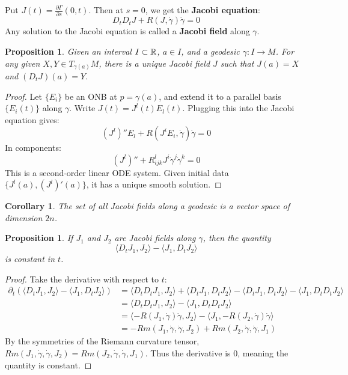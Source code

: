 \documentclass[11pt, a4paper]{article}
\theoremstyle{plain}
\newtheorem{proposition}[theorem]{Proposition}
\newtheorem{corollary}[theorem]{Corollary}
\theoremstyle{definition}
\theoremstyle{remark}
\begin{document}
{Put $J(t) = \frac{\partial \Gamma}{\partial s}(0,t)$. Then at $s=0$, we get the \textbf{Jacobi equation}:
\[ D_t D_t J + R(J, \dot{\gamma})\dot{\gamma} = 0 \]
Any solution to the Jacobi equation is called a \textbf{Jacobi field} along $\gamma$.

\begin{proposition}
Given an interval $I \subset \mathbb{R}$, $a \in I$, and a geodesic $\gamma: I \to M$. For any given $X, Y \in T_{\gamma(a)}M$, there is a unique Jacobi field $J$ such that $J(a) = X$ and $(D_t J)(a) = Y$.
\end{proposition}
\begin{proof}
Let $\{E_i\}$ be an ONB at $p = \gamma(a)$, and extend it to a parallel basis $\{E_i(t)\}$ along $\gamma$.
Write $J(t) = J^l(t) E_l(t)$. Plugging this into the Jacobi equation gives:
\[ (J^l)'' E_l + R(J^i E_i, \dot{\gamma})\dot{\gamma} = 0 \]
In components:
\[ (J^l)'' + R_{ijk}^l J^i \dot{\gamma}^j \dot{\gamma}^k = 0 \]
This is a second-order linear ODE system. Given initial data $\{J^l(a), (J^l)'(a)\}$, it has a unique smooth solution.
\end{proof}

\begin{corollary}
The set of all Jacobi fields along a geodesic is a vector space of dimension $2n$.
\end{corollary}

\begin{proposition}
If $J_1$ and $J_2$ are Jacobi fields along $\gamma$, then the quantity
\[ \langle D_t J_1, J_2 \rangle - \langle J_1, D_t J_2 \rangle \]
is constant in $t$.
\end{proposition}
\begin{proof}
Take the derivative with respect to $t$:
\begin{align*}
    \partial_t (\langle D_t J_1, J_2 \rangle - \langle J_1, D_t J_2 \rangle) &= \langle D_t D_t J_1, J_2 \rangle + \langle D_t J_1, D_t J_2 \rangle - \langle D_t J_1, D_t J_2 \rangle - \langle J_1, D_t D_t J_2 \rangle \\
    &= \langle D_t D_t J_1, J_2 \rangle - \langle J_1, D_t D_t J_2 \rangle \\
    &= \langle -R(J_1, \dot{\gamma})\dot{\gamma}, J_2 \rangle - \langle J_1, -R(J_2, \dot{\gamma})\dot{\gamma} \rangle \\
    &= -Rm(J_1, \dot{\gamma}, \dot{\gamma}, J_2) + Rm(J_2, \dot{\gamma}, \dot{\gamma}, J_1)
\end{align*}
By the symmetries of the Riemann curvature tensor, $Rm(J_1, \dot{\gamma}, \dot{\gamma}, J_2) = Rm(J_2, \dot{\gamma}, \dot{\gamma}, J_1)$. Thus the derivative is $0$, meaning the quantity is constant.
\end{proof}

}
\end{document}
